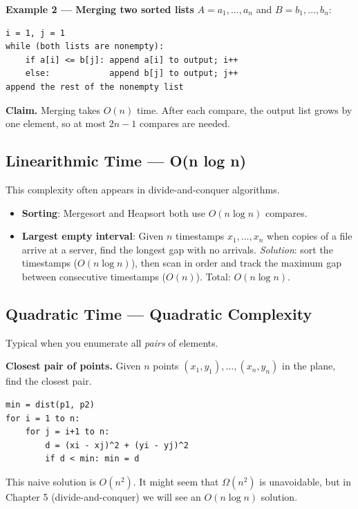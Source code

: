 \documentclass[12pt,a4paper]{report}
\begin{document}
\textbf{Example 2 — Merging two sorted lists} $A = a_1, \ldots, a_n$ and
$B = b_1, \ldots, b_n$:

\begin{Verbatim}[frame=single]
i = 1, j = 1
while (both lists are nonempty):
    if a[i] <= b[j]: append a[i] to output; i++
    else:            append b[j] to output; j++
append the rest of the nonempty list
\end{Verbatim}

\textbf{Claim.} Merging takes $O(n)$ time. After each compare, the output list grows by
one element, so at most $2n - 1$ compares are needed.

\subsection{Linearithmic Time — O(n log n)}

This complexity often appears in divide-and-conquer algorithms.

\begin{itemize}
    \item \textbf{Sorting}: Mergesort and Heapsort both use $O(n \log n)$ compares.
    \item \textbf{Largest empty interval}: Given $n$ timestamps $x_1, \ldots, x_n$
    when copies of a file arrive at a server, find the longest gap with no arrivals.
    \emph{Solution}: sort the timestamps ($O(n \log n)$), then scan in order and track
    the maximum gap between consecutive timestamps ($O(n)$). Total: $O(n \log n)$.
\end{itemize}

\subsection{Quadratic Time — Quadratic Complexity}

Typical when you enumerate all \emph{pairs} of elements.

\textbf{Closest pair of points.} Given $n$ points $(x_1, y_1), \ldots, (x_n, y_n)$ in
the plane, find the closest pair.

\begin{Verbatim}[frame=single]
min = dist(p1, p2)
for i = 1 to n:
    for j = i+1 to n:
        d = (xi - xj)^2 + (yi - yj)^2
        if d < min: min = d
\end{Verbatim}

This naive solution is $O(n^2)$. It might seem that $\Omega(n^2)$ is unavoidable, but in
Chapter 5 (divide-and-conquer) we will see an $O(n \log n)$ solution.
\end{document}
